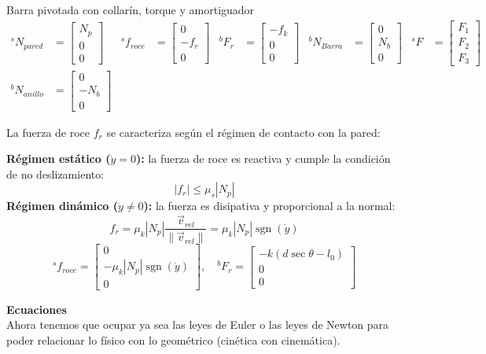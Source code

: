 \begin{solucion}{Barra pivotada con collarín, torque y amortiguador}
\begin{align*}
    {}^s N_{pared} &= \begin{bmatrix} N_p \\ 0 \\ 0 \end{bmatrix} &
    {}^s f_{roce} &= \begin{bmatrix} 0 \\ -f_r \\ 0 \end{bmatrix} &
    {}^b F_r &= \begin{bmatrix} -f_k \\ 0 \\ 0 \end{bmatrix} &
    {}^b N_{Barra} &= \begin{bmatrix} 0 \\ N_b \\ 0 \end{bmatrix} &
    {}^s F &= \begin{bmatrix} F_1 \\ F_2 \\ F_3 \end{bmatrix} \\[10pt]
    {}^b N_{anillo} &= \begin{bmatrix} 0 \\ -N_b \\ 0 \end{bmatrix}
\end{align*}

La fuerza de roce $f_r$ se caracteriza según el régimen de contacto con la pared:

\textbf{Régimen estático ($\dot{y} = 0$):} la fuerza de roce es reactiva y cumple la condición de no deslizamiento:
$$|f_r| \leq \mu_s |N_p|$$
\textbf{Régimen dinámico ($\dot{y} \neq 0$):} la fuerza es disipativa y proporcional a la normal:
$$f_r = \mu_k |N_p| \frac{\vec{v}_{rel}}{\|\vec{v}_{rel}\|} = \mu_k |N_p| \operatorname{sgn}(\dot{y})$$
$$
{}^s f_{roce} = \begin{bmatrix} 0 \\ -\mu_k |N_p| \operatorname{sgn}(\dot{y}) \\ 0 \end{bmatrix} , \quad
{}^b F_r = \begin{bmatrix} -k(d \sec \theta - l_0) \\ 0 \\ 0 \end{bmatrix}
$$

\textbf{Ecuaciones}\\
Ahora tenemos que ocupar ya sea las leyes de Euler o las leyes de Newton para poder relacionar lo físico con lo geométrico (cinética con cinemática).


\end{solucion}
